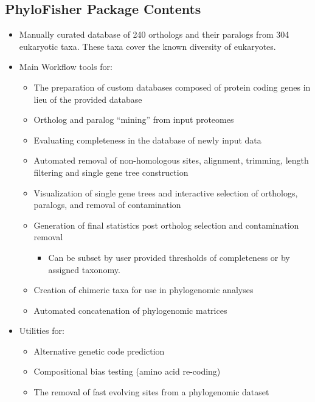 \documentclass{article}
\begin{document}
        \subsection{PhyloFisher Package Contents}
        \begin{itemize}
            \item Manually curated database of 240 orthologs and their paralogs from 304 eukaryotic taxa. These taxa cover the known diversity of eukaryotes.
            \item Main Workflow tools for:
                \begin{itemize}
                    \item The preparation of custom databases composed of protein coding genes in lieu of the provided database
                    \item Ortholog and paralog “mining” from input proteomes
                    \item Evaluating completeness in the database of newly input data
                    \item Automated removal of non-homologous sites, alignment, trimming, length filtering and single gene tree construction
                    \item Visualization of single gene trees and interactive selection of orthologs, paralogs, and removal of contamination
                    \item Generation of final statistics post ortholog selection and contamination removal
                        \begin{itemize}
                            \item Can be subset by user provided thresholds of completeness or by assigned taxonomy.
                        \end{itemize}
                    \item Creation of chimeric taxa for use in phylogenomic analyses
                    \item Automated concatenation of phylogenomic matrices
                \end{itemize}
            \item Utilities for:
                \begin{itemize}
                    \item Alternative genetic code prediction
                    \item Compositional bias testing (amino acid re-coding)
                    \item The removal of fast evolving sites from a phylogenomic dataset

\end{itemize}
\end{itemize}
\end{document}

